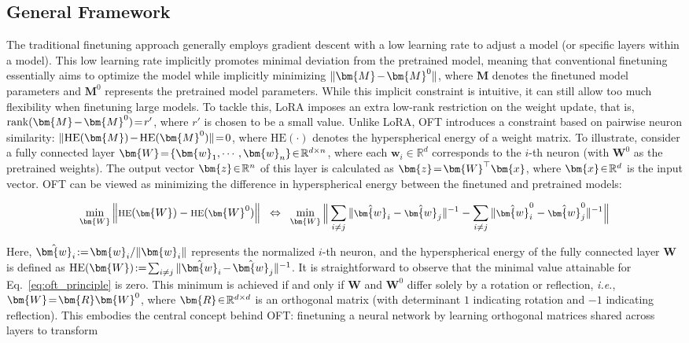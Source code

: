 \subsection{General Framework}

The traditional finetuning approach generally employs gradient descent with a low learning rate to adjust a model (or specific layers within a model). This low learning rate implicitly promotes minimal deviation from the pretrained model, meaning that conventional finetuning essentially aims to optimize the model while implicitly minimizing $\thickmuskip=2mu \medmuskip=2mu \| \bm{M} - \bm{M}^0\|$, where $\bm{M}$ denotes the finetuned model parameters and $\bm{M}^0$ represents the pretrained model parameters. While this implicit constraint is intuitive, it can still allow too much flexibility when finetuning large models. To tackle this, LoRA imposes an extra low-rank restriction on the weight update, that is, $\thickmuskip=2mu \medmuskip=2mu \text{rank}(\bm{M} - \bm{M}^0)=r'$, where $r'$ is chosen to be a small value. Unlike LoRA, OFT introduces a constraint based on pairwise neuron similarity: $\thickmuskip=2mu \medmuskip=2mu \| \text{HE}(\bm{M})-\text{HE}(\bm{M}^0) \|=0$, where $\text{HE}(\cdot)$ denotes the hyperspherical energy of a weight matrix. To illustrate, consider a fully connected layer $\thickmuskip=2mu \medmuskip=2mu \bm{W}=\{\bm{w}_1,\cdots,\bm{w}_n\}\in\mathbb{R}^{d\times n}$, where each $\bm{w}_i\in\mathbb{R}^{d}$ corresponds to the $i$-th neuron (with $\bm{W}^0$ as the pretrained weights). The output vector $\thickmuskip=2mu \medmuskip=2mu \bm{z}\in\mathbb{R}^n$ of this layer is calculated as $\thickmuskip=2mu \medmuskip=2mu \bm{z}=\bm{W}^\top\bm{x}$, where $\thickmuskip=2mu \medmuskip=2mu \bm{x}\in\mathbb{R}^d$ is the input vector. OFT can be viewed as minimizing the difference in hyperspherical energy between the finetuned and pretrained models:

\begin{equation}\label{eq:oft_principle}
\footnotesize
\min_{\bm{W}} \left\| \text{HE}(\bm{W})-\text{HE}(\bm{W}^0)\right\|~~\Leftrightarrow~~\min_{\bm{W}} \bigg{\|} \sum_{i\neq j} \|\hat{\bm{w}}_i-\hat{\bm{w}}_j\|^{-1}-\sum_{i\neq j} \|\hat{\bm{w}}^0_i-\hat{\bm{w}}^0_j\|^{-1}\bigg{\|}
\end{equation}

Here, $\thickmuskip=2mu \medmuskip=2mu \hat{\bm{w}}_i:=\bm{w}_i/\|\bm{w}_i\|$ represents the normalized $i$-th neuron, and the hyperspherical energy of the fully connected layer $\bm{W}$ is defined as $\thickmuskip=2mu \medmuskip=2mu \text{HE}(\bm{W}):= \sum_{i\neq j} \|\hat{\bm{w}}_i-\hat{\bm{w}}_j\|^{-1}$. It is straightforward to observe that the minimal value attainable for Eq.~\eqref{eq:oft_principle} is zero. This minimum is achieved if and only if $\bm{W}$ and $\bm{W}^0$ differ solely by a rotation or reflection, \emph{i.e.}, $\thickmuskip=2mu \medmuskip=2mu \bm{W}=\bm{R}\bm{W}^0$, where $\thickmuskip=2mu \medmuskip=2mu \bm{R}\in\mathbb{R}^{d\times d}$ is an orthogonal matrix (with determinant $1$ indicating rotation and $-1$ indicating reflection). This embodies the central concept behind OFT: finetuning a neural network by learning orthogonal matrices shared across layers to transform

